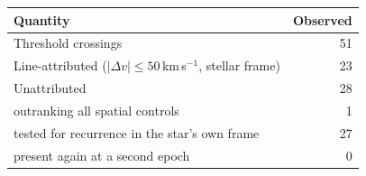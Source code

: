 \begin{tabular}{@{}lr@{}}
\hline
Quantity & Observed \\
\hline
Threshold crossings & 51 \\
Line-attributed ($|\Delta v|\leq50$\,km\,s$^{-1}$, stellar frame) & 23 \\
Unattributed & 28 \\
\quad outranking all spatial controls & 1 \\
\quad tested for recurrence in the star's own frame & 27 \\
\quad present again at a second epoch & 0 \\
\hline
\end{tabular}
